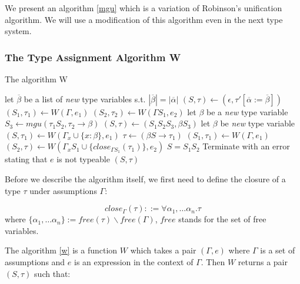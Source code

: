 We present an algorithm \ref{mgu} which is a variation of Robinson's unification algorithm. We will use a modification of this algorithm even in the next type system.

\subsubsection{The Type Assignment Algorithm W}

\begin{algorithm}[t]
\caption{The algorithm W \cite{milner1978theory}}
\label{w}
\begin{algorithmic}[1]
    \State let $\overline{\beta}$ be a list of \emph{new} type variables s.t. $|\overline{\beta}| = |\overline{\alpha}|$
    \State $(S, \tau) \gets (\epsilon, \tau' [\overline{\alpha} := \overline{\beta}])$
    \State $(S_1, \tau_1) \gets W(\Gamma, e_1)$
    \State $(S_2, \tau_2) \gets W(\Gamma S_1, e_2)$
    \State let $\beta$ be a \emph{new} type variable
    \State $S_3 \gets mgu (\tau_1 S_2, \tau_2 \rightarrow \beta)$
    \State $(S, \tau) \gets (S_1 S_2 S_3, \beta S_3)$
    \State let $\beta$ be \emph{new} type variable
    \State $(S, \tau_1) \gets W(\Gamma_x \cup \{x : \beta\}, e_1)$
    \State $\tau \gets (\beta S \rightarrow \tau_1)$
    \State $(S_1, \tau_1) \gets W(\Gamma, e_1)$
    \State $(S_2, \tau) \gets W(\Gamma_x S_1 \cup \{close_{\Gamma S_1}(\tau_1)\}, e_2)$
    \State $S = S_1 S_2$
    \Else
    \State Terminate with an error stating that $e$ is not typeable
    \EndIf
    \State \Return $(S, \tau)$
\EndFunction
\end{algorithmic}
\end{algorithm}

Before we describe the algorithm itself, we first need to define the closure of a type $\tau$ under assumptions $\Gamma$:

\begin{defn}
    \label{defn:close}
    $$close_\Gamma(\tau) ::= \forall \alpha_1, \dots \alpha_n . \tau$$
    where $\{\alpha_1, \dots \alpha_n\} := free(\tau) \backslash free(\Gamma)$, $free$ stands for the set of free variables. %
\end{defn}

The algorithm \ref{w} is a function $W$ which takes a pair $(\Gamma, e)$ where $\Gamma$ is a set of assumptions and $e$ is an expression in the context of $\Gamma$. Then $W$ returns a pair $(S, \tau)$ such that:


